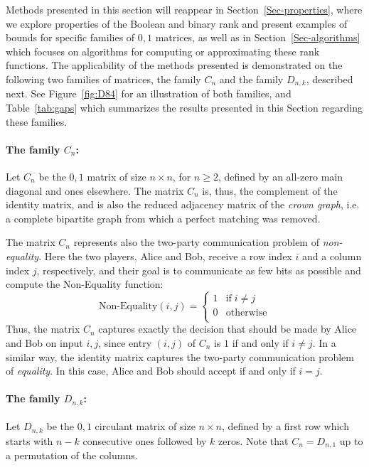 \documentclass[11pt]{article}
\begin{document}
Methods presented in this section will reappear in Section~\ref{Sec-properties}, where we explore properties of the Boolean and binary rank and present examples of
bounds for specific families of $0,1$ matrices, as well as in Section~\ref{Sec-algorithms}
which focuses on algorithms for computing or approximating these rank functions.
The applicability of the methods presented is demonstrated on the following two families of matrices, the family $C_n$ and the family $D_{n,k}$, described next.
See Figure~\ref{fig:D84} for an illustration of both families, and Table~\ref{tab:gaps} which summarizes the results presented in this Section
regarding these families.

\vspace{-0.5 cm}
\paragraph{The family $C_n$:} Let $C_n$ be the $0,1$  matrix of size $n \times n$, for $n \geq 2$, defined by an all-zero main diagonal and ones elsewhere.
The matrix $C_n$ is, thus, the complement of the identity matrix, and is also the reduced adjacency matrix of the {\em crown graph},
i.e. a complete bipartite graph from which a perfect matching was removed.

The matrix $C_n$ represents also the two-party communication problem of {\em non-equality}.
Here the two players, Alice and Bob, receive a row index $i$ and a column index $j$, respectively,
and their goal is to communicate as few bits as possible and compute the Non-Equality function:
$$ \text{Non-Equality}(i,j) = \left\{
                         \begin{array}{cc}
                           1 & \text{if} \; i \neq j \\
                           0 & \text{otherwise} \\
                         \end{array}
                         \right.
$$
Thus, the matrix $C_n$ captures exactly the decision that should be made by Alice and Bob on input $i,j$, since entry $(i,j)$ of $C_n$ is $1$ if and only if $i \neq j$.
In a similar way, the identity matrix captures the two-party communication problem of {\em equality}. In this case, Alice and Bob should accept if and only if $i = j$.

\vspace{-0.5 cm}
\paragraph{The family $D_{n,k}$:} Let $D_{n,k}$ be the $0,1$ circulant matrix of size $n \times n$, defined by a first row which starts with $n-k$ consecutive ones followed by $k$ zeros.
Note that $C_n = D_{n,1}$ up to a permutation of the columns.
\end{document}

